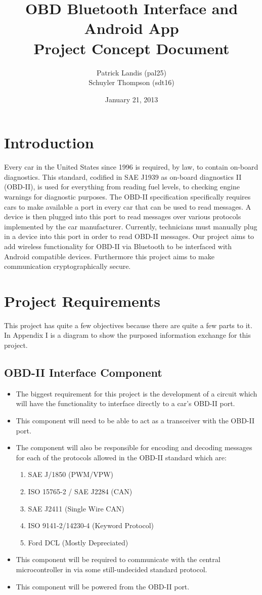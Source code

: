 \documentclass[12pt,letterpaper]{article}
\title{
\textbf{\LARGE OBD Bluetooth Interface and Android App} \\
\Large Project Concept Document
}
\author{
\normalsize Patrick Landis (pal25) \\
\normalsize Schuyler Thompson (sdt16)
}
\date{\normalsize January 21, 2013}
\begin{document}
\maketitle

\section{Introduction}
Every car in the United States since 1996 is required, by law, to contain on-board diagnostics. This standard, codified in SAE J1939 as on-board diagnostics II (OBD-II), is used for everything from reading fuel levels, to checking engine warnings for diagnostic purposes. The OBD-II specification specifically requires cars to make available a port in every car that can be used to read messages. A device is then plugged into this port to read messages over various protocols implemented by the car manufacturer. Currently, technicians must manually plug in a device into this port in order to read OBD-II messages. Our project aims to add wireless functionality for OBD-II via Bluetooth to be interfaced with Android compatible devices. Furthermore this project aims to make communication cryptographically secure.


\section{Project Requirements}
This project has quite a few objectives because there are quite a few parts to it. In Appendix I is a diagram to show the purposed information exchange for this project.

\subsection {OBD-II Interface Component}
\begin{itemize}
	\item The biggest requirement for this project is the development of a circuit which will have the functionality to interface directly to a car's OBD-II port. 
	\item This component will need to be able to act as a transceiver with the OBD-II port.
	\item The component will also be responsible for encoding and decoding messages for each of the protocols allowed in the OBD-II standard which are:
	\begin{enumerate}
		\item SAE J/1850 (PWM/VPW)
		\item ISO 15765-2 / SAE J2284 (CAN)
		\item SAE J2411 (Single Wire CAN)
		\item ISO 9141-2/14230-4 (Keyword Protocol)
		\item Ford DCL (Mostly Depreciated) 
	\end{enumerate}
	\item This component will be required to communicate with the central microcontroller in via some still-undecided standard protocol.
	\item This component will be powered from the OBD-II port.
\end{itemize}
\end{document}
